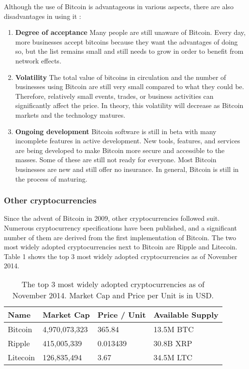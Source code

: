\documentclass{acm_proc_article-sp}
\begin{document}
Although the use of Bitcoin is advantageous in various aspects, there are also disadvantages in using it \cite{Bitcoin:2014}:
\begin{enumerate}
	\item \textbf{Degree of acceptance} Many people are still unaware of Bitcoin. Every day, more businesses accept bitcoins because they want the advantages of doing so, but the list remains small and still needs to grow in order to benefit from network effects.
	\item \textbf{Volatility} The total value of bitcoins in circulation and the number of businesses using Bitcoin are still very small compared to what they could be. Therefore, relatively small events, trades, or business activities can significantly affect the price. In theory, this volatility will decrease as Bitcoin markets and the technology matures.
	\item \textbf{Ongoing development} Bitcoin software is still in beta with many incomplete features in active development. New tools, features, and services are being developed to make Bitcoin more secure and accessible to the masses. Some of these are still not ready for everyone. Most Bitcoin businesses are new and still offer no insurance. In general, Bitcoin is still in the process of maturing.
\end{enumerate}


\subsubsection{Other cryptocurrencies}
Since the advent of Bitcoin in 2009, other cryptocurrencies followed suit. Numerous cryptocurrency specifications have been published, and a significant number of them are derived from the first implementation of Bitcoin. The two most widely adopted cryptocurrencies next to Bitcoin are Ripple and Litecoin. Table 1 shows the top 3 most widely adopted cryptocurrencies as of November 2014.


\begin{table}[h]
\centering
\begin{tabular}{ | l | l | l | l | }
\hline
  Name & Market Cap & Price / Unit & Available Supply \\ \hline \hline
  Bitcoin   & 4,970,073,323 & 365.84 & 13.5M BTC \\ \hline
  Ripple    & 415,005,339 & 0.013439 & 30.8B XRP \\ \hline
  Litecoin  & 126,835,494 & 3.67 & 34.5M LTC \\ \hline

\end{tabular}
  \caption{The top 3 most widely adopted cryptocurrencies as of November 2014. Market Cap and Price per Unit is in USD.}
\end{table}
\end{document}
